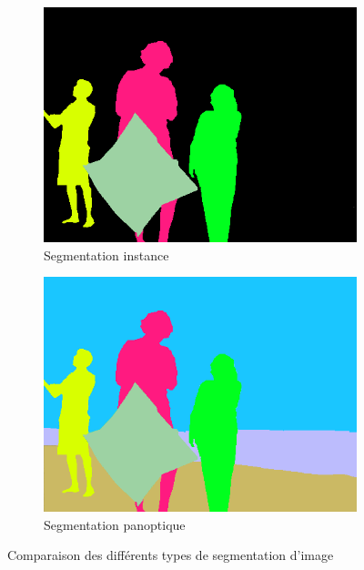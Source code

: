 \begin{figure}[H]
    \vspace{0.5cm} %
    
    \begin{subfigure}[b]{0.48\textwidth}
        \centering
        \includegraphics[width=\textwidth]{03-tail//A1_fondamentaux_ML//A1_figures/A1_28_segmentation_instance.png}
        \caption{Segmentation instance}
        \label{fig:A1_28_segmentation_instance}
    \end{subfigure}
    \hfill
    \begin{subfigure}[b]{0.48\textwidth}
        \centering
        \includegraphics[width=\textwidth]{03-tail//A1_fondamentaux_ML//A1_figures/A1_29_segmentation_panoptique.png}
        \caption{Segmentation panoptique}
        \label{fig:A1_29_segmentation_panoptique}
    \end{subfigure}
    
    \caption{Comparaison des différents types de segmentation d'image \cite{jung_benchmarking_2022}}
    \label{fig:types_segmentation}
\end{figure}

